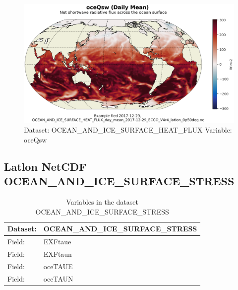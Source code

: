 \begin{figure}[H]
\centering
\includegraphics[scale=0.55]{../images/plots/latlon_plots/Ocean_and_Sea-Ice_Surface_Heat_Fluxes/oceQsw.png}
\caption{Dataset: OCEAN\_AND\_ICE\_SURFACE\_HEAT\_FLUX Variable: oceQsw}
\label{tab:table-OCEAN_AND_ICE_SURFACE_HEAT_FLUX_oceQsw-Plot}
\end{figure}
\pagebreak
\subsection{Latlon NetCDF OCEAN\_AND\_ICE\_SURFACE\_STRESS}
\newp
\begin{longtable}{|p{}|p{}|}
\caption{Variables in the dataset OCEAN\_AND\_ICE\_SURFACE\_STRESS}
\label{tab:table-OCEAN_AND_ICE_SURFACE_STRESS-fields} \\ 
\hline \endhead \hline \endfoot
\rowcolor{lightgray} \textbf{Dataset:} & \textbf{OCEAN\_AND\_ICE\_SURFACE\_STRESS} \\ \hline
Field: &EXFtaue \\ \hline
Field: &EXFtaun \\ \hline
Field: &oceTAUE \\ \hline
Field: &oceTAUN \\ \hline
\end{longtable}

\pagebreak
